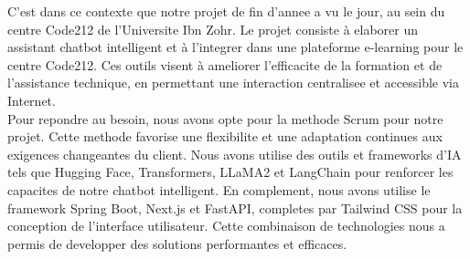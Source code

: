 C'est dans ce contexte que notre projet de fin d'annee a vu le jour, au sein du centre Code212 de l'Universite Ibn Zohr. Le projet consiste à elaborer un assistant chatbot intelligent et à l'integrer dans une plateforme e-learning pour le centre Code212. Ces outils visent à ameliorer l'efficacite de la formation et de l'assistance technique, en permettant une interaction centralisee et accessible via Internet.
\\

Pour repondre au besoin, nous avons opte pour la methode Scrum pour notre projet. Cette methode favorise une flexibilite et une adaptation continues aux exigences changeantes du client. Nous avons utilise des outils et frameworks d'IA tels que Hugging Face, Transformers, LLaMA2 et LangChain pour renforcer les capacites de notre chatbot intelligent. En complement, nous avons utilise le framework Spring Boot, Next.js et FastAPI, completes par Tailwind CSS pour la conception de l'interface utilisateur. Cette combinaison de technologies nous a permis de developper des solutions performantes et efficaces.
